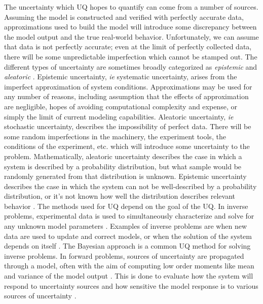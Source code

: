 The uncertainty which UQ hopes to quantify can come from a number of sources. Assuming the model is constructed and verified with perfectly accurate data, approximations used to build the model will introduce some discrepancy between the model output and the true real-world behavior. Unfortunately, we can assume that data is not perfectly accurate; even at the limit of perfectly collected data, there will be some unpredictable imperfection which cannot be stamped out. The different types of uncertainty are sometimes broadly categorized as \textit{epistemic} and \textit{aleatoric} \cite{matthies}. Epistemic uncertainty, \textit{ie} systematic uncertainty, arises from the imperfect approximation of system conditions. Approximations may be used for any number of reasons, including assumption that the effects of approximation are negligible, hopes of avoiding computational complexity and expense, or simply the limit of current modeling capabilities. Aleatoric uncertainty, \textit{ie} stochastic uncertainty, describes the impossibility of perfect data. There will be some random imperfections in the machinery, the experiment tools, the conditions of the experiment, etc. which will introduce some uncertainty to the problem. Mathematically, aleatoric uncertainty describes the case in which a system is described by a probability distribution, but what sample would be randomly generated from that distribution is unknown. Epistemic uncertainty describes the case in which the system can not be well-described by a probability distribution, or it's not known how well the distribution describes relevant behavior \cite{smithUQ}. 
The methods used for UQ depend on the goal of the UQ. In inverse problems, experimental data is used to simultaneously characterize and solve for any unknown model parameters \cite{wildey-presentation}. Examples of inverse problems are when new data are used to update and correct models, or when the solution of the system depends on itself \cite{ghanem-uq-handbook, inverse, pde}. The Bayesian approach is a common UQ method for solving inverse problems\cite{wildey-presentation, ghanem-uq-handbook}. In forward problems, sources of uncertainty are propagated through a model, often with the aim of computing low order moments like mean and variance of the model output \cite{ghanem-uq-handbook}. This is done to evaluate how the system will respond to uncertainty sources and how sensitive the model response is to various sources of uncertainty \cite{saltelliGSA}.

